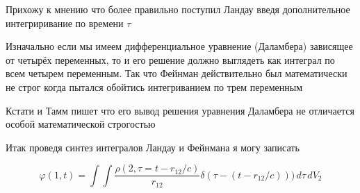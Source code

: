 \documentclass{article}
\begin{document}














Прихожу к мнению что более правильно поступил Ландау введя дополнительное интегриривание по времени $\tau$

Изначально если мы имеем дифференциальное уравнение (Даламбера) зависящее от четырёх переменных, то и его решение должно выглядеть как интеграл по всем четырем переменным. Так что Фейнман действительно был математически не строг когда пытался обойтись интегриванием по трем переменным

Кстати и Тамм пишет что его вывод решения уравнения Даламбера не отличается особой математической строгостью

Итак проведя синтез интегралов Ландау и Фейнмана я могу записать

$$\varphi(1,t) = \int\int\frac{\rho(2,\tau = t-r_{12}/c)}{r_{12}}\delta(\tau - (t-r_{12}/c)))\, d\tau\, dV_{2}$$
\end{document}
